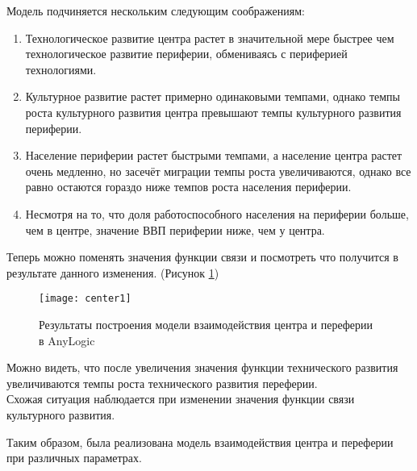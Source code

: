 Модель подчиняется нескольким следующим соображениям:
\begin{enumerate}[topsep=0pt,itemsep=-1ex,partopsep=1ex,parsep=1ex]
	\item Технологическое развитие центра растет в значительной мере быстрее чем технологическое развитие периферии, обмениваясь с периферией технологиями.
	\item Культурное развитие растет примерно одинаковыми темпами, однако темпы роста культурного развития центра превышают темпы культурного развития периферии.
	\item Население периферии растет быстрыми темпами, а население центра растет очень медленно, но засечёт миграции темпы роста увеличиваются, однако все равно остаются гораздо ниже темпов роста населения периферии.
	\item Несмотря на то, что доля работоспособного населения на периферии больше, чем в центре, значение ВВП периферии ниже, чем у центра.
\end{enumerate}

\newpage

Теперь можно поменять значения функции связи и посмотреть что получится в результате данного изменения. (Рисунок \ref{fig:center2})
\begin{figure}[h]
	\centering \texttt{[image: center1]}
	\caption{Результаты построения модели взаимодействия центра и переферии в AnyLogic}
	\label{fig:center2}
\end{figure}

Можно видеть, что после увеличения значения функции технического развития увеличиваются темпы роста технического развития переферии.\\

Схожая ситуация наблюдается при изменении значения функции связи культурного развития.

Таким образом, была реализована модель взаимодействия центра и переферии при различных параметрах.